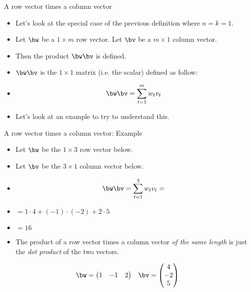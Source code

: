 \documentclass{beamer}
\begin{document}
\begin{frame}{A row vector times a column vector}

\begin{itemize}
\item Let's look at the special case of the previous definition where $n=k=1$.
\item Let $\bw$ be a $1\times m$ row vector. Let $\bv$ be a $m\times 1$ column vector.
\item Then the product $\bw \bv$ is defined.
\item $\bw \bv$ is the $1\times 1$ matrix (i.e. the scalar) defined as follow:
\item $$\bw \bv  = \sum_{t=1}^m w_t v_t$$
\item Let's look at an example to try to understand this.
\end{itemize}

\end{frame}


\begin{frame}{A row vector times a column vector: Example}

\begin{itemize}
\item Let $\bw$ be the $1\times 3$ row vector below.
\item Let $\bv$ be the $3\times 1$ column vector below.
\item $$\bw \bv  = \sum_{t=1}^3 w_t  v_t = $$
\item $ = 1\cdot 4 + (-1)\cdot (-2) + 2\cdot 5$
\item $=16$
\item The product of a row vector times a column vector
\emph{of the same length} is just the \emph{dot product} of the two vectors.
\end{itemize}

$$
\begin{matrix}

\bw =

\begin{pmatrix}
1 & -1 & 2
\end{pmatrix}

&

\bv =

\begin{pmatrix}
4 \\ -2 \\ 5
\end{pmatrix}

\end{matrix}
$$

\end{frame}
\end{document}
